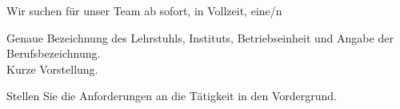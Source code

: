 %
% 
% 
%



\newcommand{\StellenausschreibungAnsprechpartner}{%
    \textbf{\UniversitaetName} \\
    Abteilung \\
    \PersonTitel{} \PersonVorname{} \PersonNachname \\
    \StellenausschreibungAdresse \\
    Tel.~\PersonTelefon \\
    \PersonEmail \\
    \PersonWebseite \\
    \UniversitaetWebseite
}

\newcommand{\StellenausschreibungStelle}{Name der Stelle}



Wir suchen für unser Team ab sofort, in Vollzeit, eine/n

\StellenausschreibungHauptueberschrift



Genaue Bezeichnung des Lehrstuhls, Instituts, Betriebseinheit und Angabe der Berufsbezeichnung.\\
Kurze Vorstellung.



Stellen Sie die Anforderungen an die Tätigkeit in den Vordergrund.

